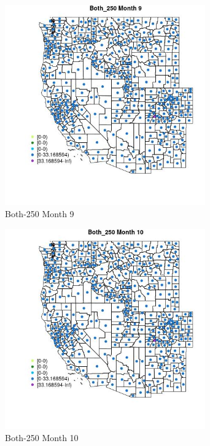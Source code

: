 \begin{figure} 
\centering  
\includegraphics[width=0.77\textwidth]{Code_Outputs/df_report_ML_predictors_CountyCentroid_Locations_Dates_2008-01-01to2018-12-31_MapObsMo9Both_250.jpg} 
\caption{\label{fig:df_report_ML_predictors_CountyCentroid_Locations_Dates_2008-01-01to2018-12-31MapObsMo9Both_250}Both-250 Month 9} 
\end{figure} 
 

\begin{figure} 
\centering  
\includegraphics[width=0.77\textwidth]{Code_Outputs/df_report_ML_predictors_CountyCentroid_Locations_Dates_2008-01-01to2018-12-31_MapObsMo10Both_250.jpg} 
\caption{\label{fig:df_report_ML_predictors_CountyCentroid_Locations_Dates_2008-01-01to2018-12-31MapObsMo10Both_250}Both-250 Month 10} 
\end{figure} 
 

